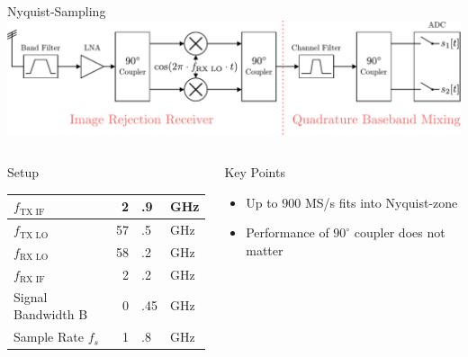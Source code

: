 \documentclass[10pt]{beamer}
\begin{document}
\begin{frame}{Nyquist-Sampling}
  \includegraphics[width=\textwidth]{figures/rx_3_bd} \\

  \begin{columns}[T]
    \begin{column}{.5\textwidth}
      \begin{block}{Setup}
        \begin{tabular}{|l|r@{}l@{~}l|}
          \hline
          $f_{\text{TX IF}}$ & 2&.9&GHz \\ \hline
          $f_{\text{TX LO}}$ & 57&.5&GHz \\ \hline
          $f_{\text{RX LO}}$ & 58&.2&GHz \\ \hline
          $f_{\text{RX IF}}$ & 2&.2&GHz \\ \hline
          Signal Bandwidth B & 0&.45&GHz \\ \hline
          Sample Rate $f_s$ & 1&.8&GHz \\ \hline
        \end{tabular}
      \end{block}
    \end{column}
    \begin{column}{.5\textwidth}
      \begin{block}{Key Points}
        \begin{itemize}
        \item Up to 900 MS/s fits into Nyquist-zone
        \item Performance of $90^\circ$ coupler does not matter
        \end{itemize}
      \end{block}
    \end{column}
  \end{columns}
\end{frame}
\end{document}
